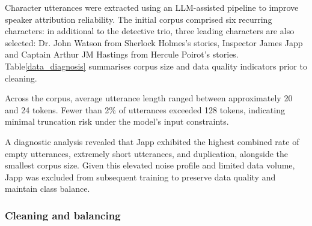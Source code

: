 \documentclass{article}
\begin{document}
Character utterances were extracted using an LLM-assisted pipeline to improve speaker attribution reliability. The initial corpus comprised six recurring characters: in additional to the detective trio, three leading characters are also selected: Dr. John Watson from Sherlock Holmes's stories, Inspector James Japp and Captain Arthur JM Hastings from Hercule Poirot's stories. Table\ref{data_diagnosis} summarises corpus size and data quality indicators prior to cleaning.
\begin{table}[h]
    \centering
\caption{Initial Corpus Statistics and Data Quality Diagnostics (\% of Utterances)}
\label{data_diagnosis}
\end{table}

Across the corpus, average utterance length ranged between approximately 20 and 24 tokens. Fewer than 2\% of utterances exceeded 128 tokens, indicating minimal truncation risk under the model’s input constraints.

A diagnostic analysis revealed that Japp exhibited the highest combined rate of empty utterances, extremely short utterances, and duplication, alongside the smallest corpus size. Given this elevated noise profile and limited data volume, Japp was excluded from subsequent training to preserve data quality and maintain class balance.

\subsubsection{Cleaning and balancing}
\end{document}
